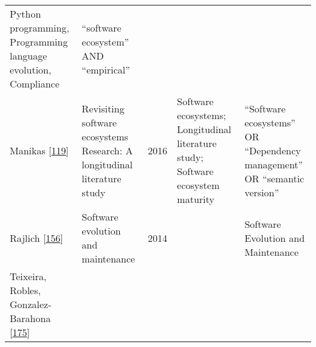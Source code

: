 \documentclass[]{book}
\begin{document}
\begin{longtable}[]{@{}lllll@{}}
\begin{minipage}[t]{0.34\columnwidth}
Python programming, Programming language evolution, Compliance\strut
\end{minipage} & \begin{minipage}[t]{0.13\columnwidth}\raggedright\strut
``software ecosystem'' AND ``empirical''\strut
\end{minipage}\tabularnewline
\begin{minipage}[t]{0.05\columnwidth}\raggedright\strut
Manikas {[}\protect\hyperlink{ref-Manikas2016}{119}{]}\strut
\end{minipage} & \begin{minipage}[t]{0.31\columnwidth}\raggedright\strut
Revisiting software ecosystems Research: A longitudinal literature
study\strut
\end{minipage} & \begin{minipage}[t]{0.02\columnwidth}\raggedright\strut
2016\strut
\end{minipage} & \begin{minipage}[t]{0.34\columnwidth}\raggedright\strut
Software ecosystems; Longitudinal literature study; Software ecosystem
maturity\strut
\end{minipage} & \begin{minipage}[t]{0.13\columnwidth}\raggedright\strut
``Software ecosystems'' OR ``Dependency management'' OR ``semantic
version''\strut
\end{minipage}\tabularnewline
\begin{minipage}[t]{0.05\columnwidth}\raggedright\strut
Rajlich {[}\protect\hyperlink{ref-Rajlich2014}{156}{]}\strut
\end{minipage} & \begin{minipage}[t]{0.31\columnwidth}\raggedright\strut
Software evolution and maintenance\strut
\end{minipage} & \begin{minipage}[t]{0.02\columnwidth}\raggedright\strut
2014\strut
\end{minipage} & \begin{minipage}[t]{0.34\columnwidth}\raggedright\strut
\strut
\end{minipage} & \begin{minipage}[t]{0.13\columnwidth}\raggedright\strut
Software Evolution and Maintenance\strut
\end{minipage}\tabularnewline
\begin{minipage}[t]{0.05\columnwidth}\raggedright\strut
Teixeira, Robles, Gonzalez-Barahona
{[}\protect\hyperlink{ref-Teixeira2015}{175}{]}\strut
\end{minipage} & \begin{minipage}[t]{0.31\columnwidth}\raggedright\strut

\end{minipage}
\end{longtable}
\end{document}
